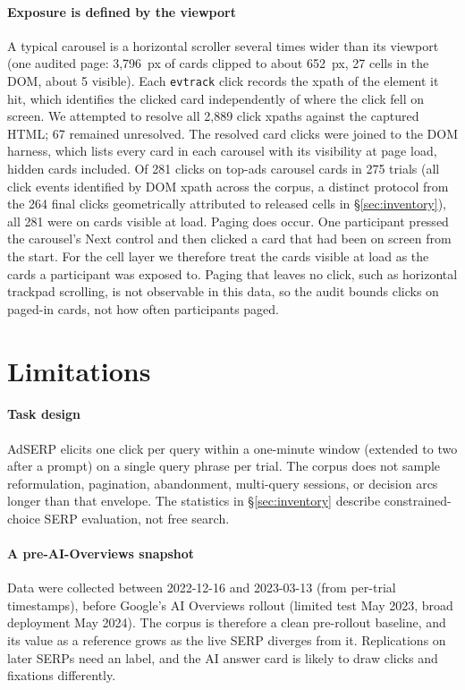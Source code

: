 \documentclass[sigconf,authorversion,natbib=true]{acmart}
\begin{document}
\paragraph{Exposure is defined by the viewport} A typical carousel is a horizontal scroller several times wider than its viewport (one audited page: 3,796~px of cards clipped to about 652~px, 27 cells in the DOM, about 5 visible). Each \texttt{evtrack} click records the xpath of the element it hit, which identifies the clicked card independently of where the click fell on screen. We attempted to resolve all 2,889 click xpaths against the captured HTML; 67 remained unresolved. The resolved card clicks were joined to the DOM harness, which lists every card in each carousel with its visibility at page load, hidden cards included. Of 281 clicks on top-ads carousel cards in 275 trials (all click events identified by DOM xpath across the corpus, a distinct protocol from the 264 final clicks geometrically attributed to released cells in \S\ref{sec:inventory}), all 281 were on cards visible at load. Paging does occur. One participant pressed the carousel's Next control and then clicked a card that had been on screen from the start. For the cell layer we therefore treat the cards visible at load as the cards a participant was exposed to. Paging that leaves no click, such as horizontal trackpad scrolling, is not observable in this data, so the audit bounds clicks on paged-in cards, not how often participants paged.

\section{Limitations}\label{sec:limits}

\paragraph{Task design} AdSERP elicits one click per query within a one-minute window (extended to two after a prompt) on a single query phrase per trial. The corpus does not sample reformulation, pagination, abandonment, multi-query sessions, or decision arcs longer than that envelope. The statistics in \S\ref{sec:inventory} describe constrained-choice SERP evaluation, not free search.

\paragraph{A pre-AI-Overviews snapshot} Data were collected between 2022-12-16 and 2023-03-13 (from per-trial timestamps), before Google's AI Overviews rollout (limited test May 2023, broad deployment May 2024). The corpus is therefore a clean pre-rollout baseline, and its value as a reference grows as the live SERP diverges from it. Replications on later SERPs need an  label, and the AI answer card is likely to draw clicks and fixations differently.
\end{document}
